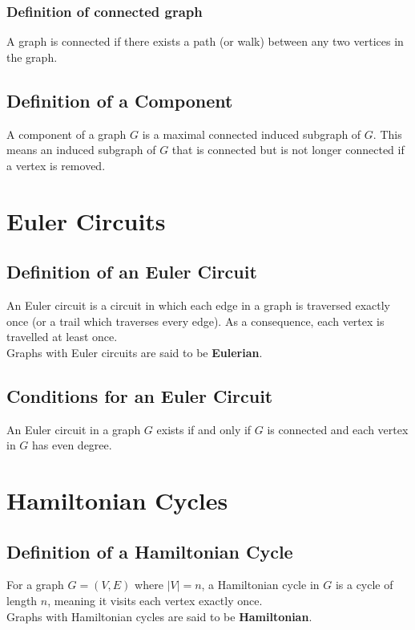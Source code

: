 \documentclass[a4paper, 12pt, twoside]{article}
\begin{document}
\subsubsection{Definition of connected graph}

A graph is connected if there exists a path (or walk) 
between any two vertices in the graph.

\subsection{Definition of a Component}

A component of a graph $G$ is a maximal connected 
induced subgraph of $G$. This means an induced subgraph of $G$
that is connected but is not longer connected if a vertex is
removed.

\section{Euler Circuits}

\subsection{Definition of an Euler Circuit}

An Euler circuit is a circuit in which each edge in a graph is
traversed exactly once (or a trail which traverses every edge).
As a consequence, each vertex is travelled at least once.
\\[\baselineskip]
Graphs with Euler circuits are said to be \textbf{Eulerian}.

\subsection{Conditions for an Euler Circuit}

An Euler circuit in a graph $G$ exists if and only if $G$ is 
connected and each vertex in $G$ has even degree.

\section{Hamiltonian Cycles}

\subsection{Definition of a Hamiltonian Cycle}

For a graph $G = (V, E)$ where $|V| = n$, a Hamiltonian cycle in $G$ is
a cycle of length $n$, meaning it visits each vertex exactly once.
\\[\baselineskip]
Graphs with Hamiltonian cycles are said to be \textbf{Hamiltonian}.
\end{document}
